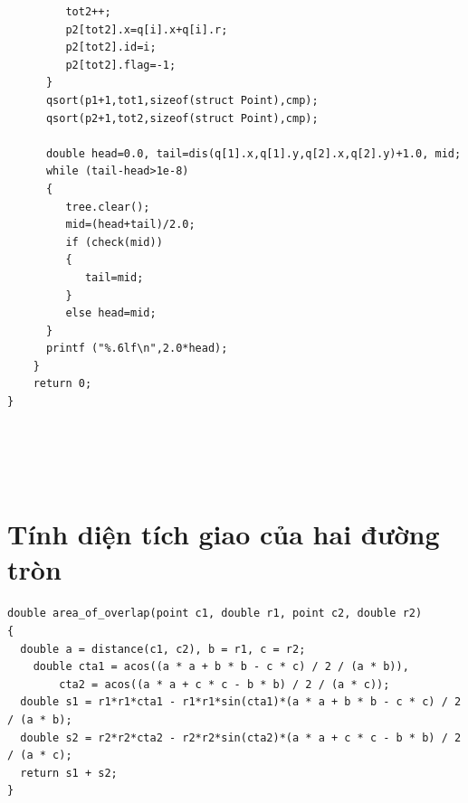 \documentclass[11pt]{article}
\begin{document}
\begin{verbatim}
         tot2++;
         p2[tot2].x=q[i].x+q[i].r;
         p2[tot2].id=i;
         p2[tot2].flag=-1;
      }
      qsort(p1+1,tot1,sizeof(struct Point),cmp);
      qsort(p2+1,tot2,sizeof(struct Point),cmp);

      double head=0.0, tail=dis(q[1].x,q[1].y,q[2].x,q[2].y)+1.0, mid;
      while (tail-head>1e-8)
      {
         tree.clear();
         mid=(head+tail)/2.0;
         if (check(mid))
         {
            tail=mid;
         }
         else head=mid;
      }
      printf ("%.6lf\n",2.0*head);
    }
    return 0;
}





\end{verbatim}
\endgroup
\section{Tính diện tích giao của hai đường tròn}
\begingroup
\scriptsize
\begin{verbatim}
double area_of_overlap(point c1, double r1, point c2, double r2)
{
  double a = distance(c1, c2), b = r1, c = r2;
    double cta1 = acos((a * a + b * b - c * c) / 2 / (a * b)),
        cta2 = acos((a * a + c * c - b * b) / 2 / (a * c));
  double s1 = r1*r1*cta1 - r1*r1*sin(cta1)*(a * a + b * b - c * c) / 2 / (a * b);
  double s2 = r2*r2*cta2 - r2*r2*sin(cta2)*(a * a + c * c - b * b) / 2 / (a * c);
  return s1 + s2;
}





\end{verbatim}
\endgroup
\end{document}
